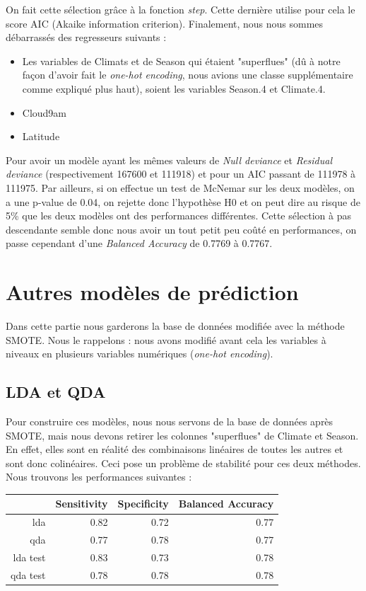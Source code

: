 \documentclass{article}
\begin{document}
On fait cette sélection grâce à la fonction \emph{step}. Cette dernière utilise pour cela le score AIC (Akaike information criterion). Finalement, nous nous sommes débarrassés des regresseurs suivants : 
\begin{itemize}
    \item Les variables de Climats et de Season qui étaient "superflues" (dû à notre façon d'avoir fait le \emph{one-hot encoding}, nous avions une classe supplémentaire comme expliqué plus haut), soient les variables Season.4 et Climate.4. 
    \item Cloud9am
    \item Latitude
\end{itemize}
Pour avoir un modèle ayant les mêmes valeurs de \emph{Null deviance} et \emph{Residual deviance} (respectivement 167600 et 111918) et pour un AIC passant de 111978 à 111975. Par ailleurs, si on effectue un test de McNemar sur les deux modèles, on a une p-value de 0.04, on rejette donc l'hypothèse H0 et on peut dire au risque de 5\% que les deux modèles ont des performances différentes. Cette sélection à pas descendante semble donc nous avoir un tout petit peu coûté en performances, on passe cependant d'une \emph{Balanced Accuracy} de 0.7769 à 0.7767.

\section{Autres modèles de prédiction}

Dans cette partie nous garderons la base de données modifiée avec la méthode SMOTE. Nous le rappelons : nous avons modifié avant cela les variables à niveaux en plusieurs variables numériques (\emph{one-hot encoding}). 

\subsection{LDA et QDA}

Pour construire ces modèles, nous nous servons de la base de données après SMOTE, mais nous devons retirer les colonnes "superflues" de Climate et Season. En effet, elles sont en réalité des combinaisons linéaires de toutes les autres et sont donc colinéaires. Ceci pose un problème de stabilité pour ces deux méthodes. Nous trouvons les performances suivantes : 
\begin{table}[ht]
    \centering
    \begin{tabular}{|r|rrr|}
        \hline
        & Sensitivity & Specificity & Balanced Accuracy \\ 
        \hline
        lda & 0.82 & 0.72 & 0.77 \\ 
        qda & 0.77 & 0.78 & 0.77 \\ 
        \hline
        \hline
        lda test & 0.83 & 0.73 & 0.78 \\ 
        qda test & 0.78 & 0.78 & 0.78 \\ 
        \hline
    \end{tabular}
\end{table}
\end{document}
